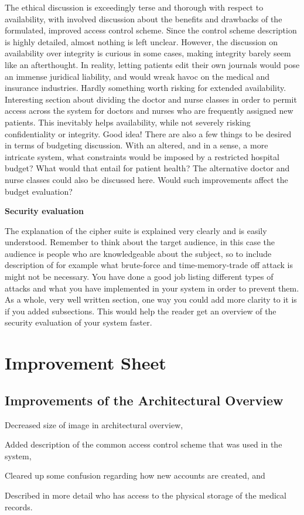 \documentclass{article}
\begin{document}
The ethical discussion is exceedingly terse and thorough with respect to availability, with involved discussion about the benefits and drawbacks of the formulated, improved access control scheme. Since the control scheme description is highly detailed, almost nothing is left unclear. However, the discussion on availability over integrity is curious in some cases, making integrity barely seem like an afterthought. In reality, letting patients edit their own journals would pose an immense juridical liability, and would wreak havoc on the medical and insurance industries. Hardly something worth risking for extended availability. Interesting section about dividing the doctor and nurse classes in order to permit access across the system for doctors and nurses who are frequently assigned new patients. This inevitably helps availability, while not severely risking confidentiality or integrity. Good idea! There are also a few things to be desired in terms of budgeting discussion. With an altered, and in a sense, a more intricate system, what constraints would be imposed by a restricted hospital budget? What would that entail for patient health? The alternative doctor and nurse classes could also be discussed here. Would such improvements affect the budget evaluation?

\textbf{Security evaluation}

The explanation of the cipher suite is explained very clearly and is easily understood. Remember to think about the target audience, in this case the audience is people who are knowledgeable about the subject, so to include description of for example what brute-force and time-memory-trade off attack is might not be necessary. You have done a good job listing different types of attacks and what you have implemented in your system in order to prevent them. As a whole, very well written section, one way you could add more clarity to it is if you added subsections. This would help the reader get an overview of the security evaluation of your system faster.

\newpage

\section*{Improvement Sheet}

\subsection*{Improvements of the Architectural Overview}
\begin{description}[font=$\bullet$\scshape\bfseries]
    \item Decreased size of image in architectural overview,
    \item Added description of the common access control scheme that was used in the system,
    \item Cleared up some confusion regarding how new accounts are created, and
    \item Described in more detail who has access to the physical storage of the medical records.
\end{description}
\end{document}
